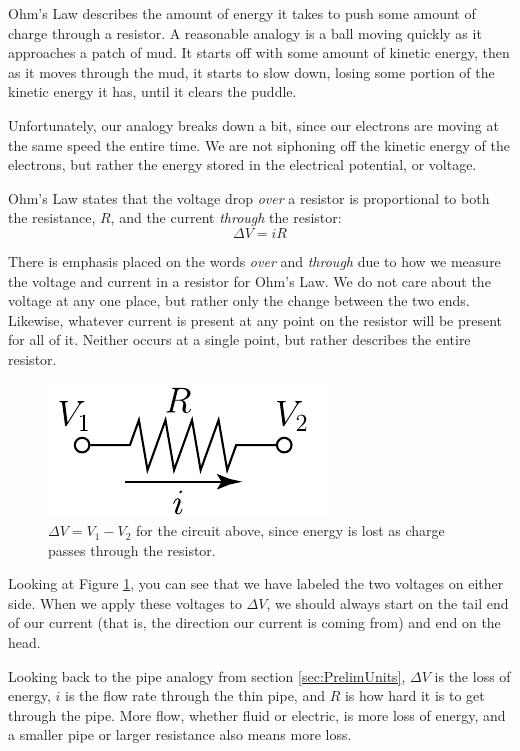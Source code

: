 Ohm's Law describes the amount of energy it takes to push some amount of charge through a resistor.  A reasonable analogy is a ball moving quickly as it approaches a patch of mud.  It starts off with some amount of kinetic energy, then as it moves through the mud, it starts to slow down, losing some portion of the kinetic energy it has, until it clears the puddle.

Unfortunately, our analogy breaks down a bit, since our electrons are moving at the same speed the entire time.  We are not siphoning off the kinetic energy of the electrons, but rather the energy stored in the electrical potential, or voltage.

Ohm's Law states that the voltage drop {\it over} a resistor is proportional to both the resistance, $R$, and the current {\it through} the resistor:
\begin{equation}
  \Delta V = iR
\end{equation}

There is emphasis placed on the words {\it over} and {\it through} due to how we measure the voltage and current in a resistor for Ohm's Law.  We do not care about the voltage at any one place, but rather only the change between the two ends.  Likewise, whatever current is present at any point on the resistor will be present for all of it.  Neither occurs at a single point, but rather describes the entire resistor.

\begin{figure}
   \centering
  \includegraphics{figures/ohmsLaw}
  \caption{$\Delta V = V_1 - V_2$ for the circuit above, since energy is lost as charge passes through the resistor.}
  \label{fig:ohmsLaw}
\end{figure}

Looking at Figure \ref{fig:ohmsLaw}, you can see that we have labeled the two voltages on either side.  When we apply these voltages to $\Delta V$, we should always start on the tail end of our current (that is, the direction our current is coming from) and end on the head.  

Looking back to the pipe analogy from section \ref{sec:PrelimUnits}, $\Delta V$ is the loss of energy, $i$ is the flow rate through the thin pipe, and $R$ is how hard it is to get through the pipe.  More flow, whether fluid or electric, is more loss of energy, and a smaller pipe or larger resistance also means more loss.
